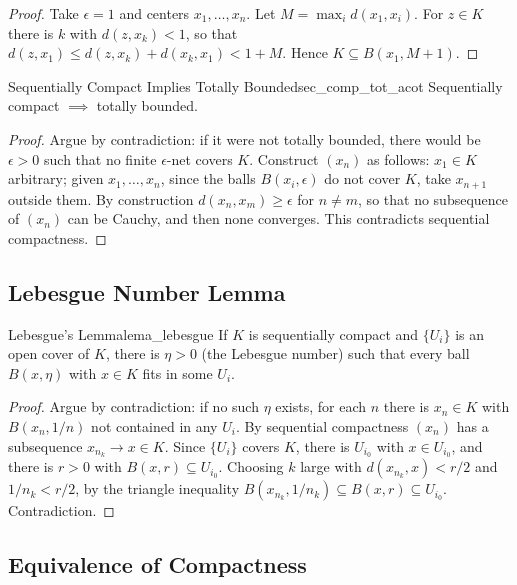 \documentclass[11pt, a4paper]{article}
\begin{document}
\begin{proof}
Take $\epsilon = 1$ and centers $x_1, \dots, x_n$. Let $M = \max_i d(x_1, x_i)$.
For $z \in K$ there is $k$ with $d(z, x_k) < 1$,
so that $d(z, x_1) \le d(z, x_k) + d(x_k, x_1) < 1 + M$.
Hence $K \subseteq B(x_1, M+1)$.
\end{proof}

\begin{proposicion}{Sequentially Compact Implies Totally Bounded}{sec_comp_tot_acot}
Sequentially compact $\implies$ totally bounded.
\end{proposicion}

\begin{proof}
Argue by contradiction: if it were not totally bounded, there would be $\epsilon > 0$ such that no
finite $\epsilon$-net covers $K$.
Construct $(x_n)$ as follows: $x_1 \in K$ arbitrary; given $x_1, \dots, x_n$,
since the balls $B(x_i, \epsilon)$ do not cover $K$, take $x_{n+1}$ outside them.
By construction $d(x_n, x_m) \ge \epsilon$ for $n \ne m$,
so that no subsequence of $(x_n)$ can be Cauchy, and then none converges.
This contradicts sequential compactness.
\end{proof}

\subsection{Lebesgue Number Lemma}

\begin{proposicion}{Lebesgue's Lemma}{lema_lebesgue}
If $K$ is sequentially compact and $\{U_i\}$ is an open cover of $K$, there is $\eta > 0$ (the
Lebesgue number) such that every ball $B(x, \eta)$ with $x \in K$ fits in some $U_i$.
\end{proposicion}

\begin{proof}
Argue by contradiction: if no such $\eta$ exists, for each $n$ there is $x_n \in K$ with $B(x_n, 1/n)$ not contained
in any $U_i$. By sequential compactness $(x_n)$ has a subsequence $x_{n_k} \to x \in K$. Since
$\{U_i\}$ covers $K$, there is $U_{i_0}$ with $x \in U_{i_0}$, and there is $r > 0$ with
$B(x, r) \subseteq U_{i_0}$. Choosing $k$ large with $d(x_{n_k}, x) < r/2$ and $1/n_k < r/2$, by the
triangle inequality $B(x_{n_k}, 1/n_k) \subseteq B(x, r) \subseteq U_{i_0}$. Contradiction.
\end{proof}

\subsection{Equivalence of Compactness}
\end{document}
